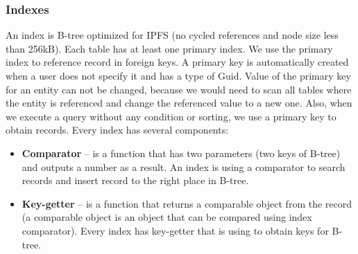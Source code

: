\subsubsection{Indexes}
An index is B-tree optimized for IPFS (no cycled references and node size less than 256kB). Each table has at least one primary index. We use the primary index to reference record in foreign keys. A primary key is automatically created when a user does not specify it and has a type of Guid. Value of the primary key for an entity can not be changed, because we would need to scan all tables where the entity is referenced and change the referenced value to a new one. Also, when we execute a query without any condition or sorting, we use a primary key to obtain records. Every index has several components: 
\begin{itemize}
    \item \textbf{Comparator} -- is a function that has two parameters (two keys of B-tree) and outputs a number as a result. An index is using a comparator to search records and insert record to the right place in B-tree.
    \item \textbf{Key-getter} -- is a function that returns a comparable object from the record (a comparable object is an object that can be compared using index comparator). Every index has key-getter that is using to obtain keys for B-tree.
\end{itemize}


